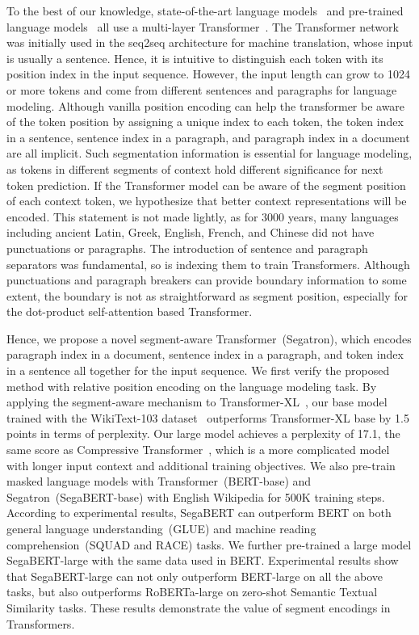 \documentclass[letterpaper]{article}
\begin{document}
To the best of our knowledge, state-of-the-art language models~\cite{DBLP:conf/acl/DaiYYCLS19, DBLP:conf/iclr/BaevskiA19, DBLP:conf/iclr/RaePJHL20} and pre-trained language models~\cite{gpt,DBLP:journals/corr/bert,DBLP:conf/nips/XLNet,DBLP:conf/iclr/albert} all use a multi-layer Transformer~\cite{DBLP:conf/nips/VaswaniSPUJGKP17}. 
The Transformer network was initially used in the seq2seq architecture for machine translation, whose input is usually a sentence. 
Hence, it is intuitive to distinguish each token with its position index in the input sequence. 
However, the input length can grow to 1024 or more tokens and come from different sentences and paragraphs for language modeling. 
Although vanilla position encoding can help the transformer be aware of the token position by assigning a unique index to each token, the token index in a sentence, sentence index in a paragraph, and paragraph index in a document are all implicit.
Such segmentation information is essential for language modeling, as tokens in different segments of context hold different significance for next token prediction.
If the Transformer model can be aware of the segment position of each context token, we hypothesize that better context representations will be encoded.
This statement is not made lightly, as for 3000 years, many languages including ancient Latin, Greek, English, French, and Chinese did not have punctuations or paragraphs. 
The introduction of sentence and paragraph separators was fundamental, so is indexing them to train Transformers. 
Although punctuations and paragraph breakers can provide boundary information to some extent, the boundary is not as straightforward as segment position, especially for the dot-product self-attention based Transformer.

Hence, we propose a novel segment-aware Transformer~(Segatron), which encodes paragraph index in a document, sentence index in a paragraph, and token index in a sentence all together for the input sequence. 
We first verify the proposed method with relative position encoding on the language modeling task. 
By applying the segment-aware mechanism to Transformer-XL~\cite{DBLP:conf/acl/DaiYYCLS19}, our base model trained with the WikiText-103 dataset~\cite{DBLP:conf/iclr/MerityX0S17} outperforms Transformer-XL base by 1.5 points in terms of perplexity. 
Our large model achieves a perplexity of 17.1, the same score as Compressive Transformer~\cite{DBLP:conf/iclr/RaePJHL20}, which is a more complicated model with longer input context and additional training objectives.
We also pre-train masked language models with Transformer~(BERT-base) and Segatron~(SegaBERT-base) with English Wikipedia for 500K training steps. 
According to experimental results, SegaBERT can outperform BERT on both general language understanding~(GLUE) and machine reading comprehension~(SQUAD and RACE) tasks.
We further pre-trained a large model SegaBERT-large with the same data used in BERT. Experimental results show that SegaBERT-large can not only outperform BERT-large on all the above tasks, but also outperforms RoBERTa-large on zero-shot Semantic Textual Similarity tasks.
These results demonstrate the value of segment encodings in Transformers.
\end{document}
